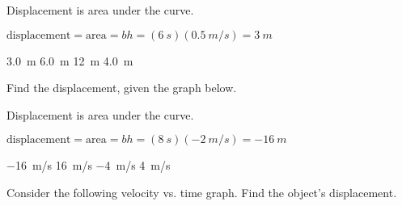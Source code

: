 \documentclass[]{exam}
\begin{document}
\begin{questions}
\ifprintanswers
{\color{red}
Displacement is area under the curve.

$\displaystyle \text{displacement} = \text{area} = bh = (\SI{6}{s})(\SI{0.5}{m/s}) = \boxed{\SI{3}{m}}$
}
\fi

\begin{randomizechoices}
    \correctchoice \SI{3.0}{m}
    \choice \SI{6.0}{m}
    \choice \SI{12}{m}
    \choice \SI{4.0}{m}
\end{randomizechoices}

\question
Find the displacement, given the graph below.

\begin{center}
\end{center}

\ifprintanswers
{\color{red}
Displacement is area under the curve.

$\displaystyle \text{displacement} = \text{area} = bh = (\SI{8}{s})(\SI{-2}{m/s}) = \boxed{\SI{-16}{m}}$
}
\fi

\begin{randomizeoneparchoices}
    \correctchoice \SI{-16}{m/s}
    \choice \SI{16}{m/s}
    \choice \SI{-4}{m/s}
    \choice \SI{4}{m/s}
\end{randomizeoneparchoices}

\question
Consider the following velocity vs. time graph. Find the object's displacement.


\end{questions}
\end{document}
